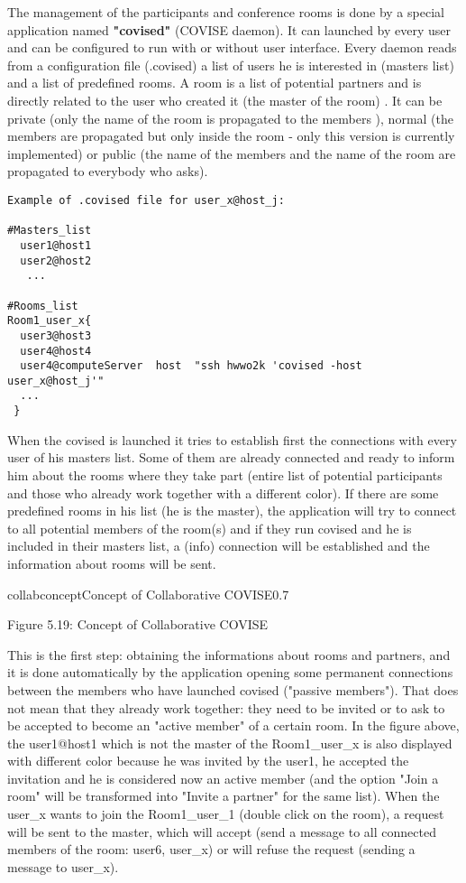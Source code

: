 The management of the participants and conference rooms is done by a special 
application named {\bf "covised"} (COVISE daemon). It can launched by every user and can be 
configured to run with or without user interface. Every daemon reads from a 
configuration file (.covised) a list of users he is interested in (masters list) and 
a list of predefined rooms. A room is a list of potential partners and is directly 
related to the user who created it (the master of the room) . It can be 
private (only the name of the room is propagated to the members ), normal 
(the members are propagated but only inside the room - only this version is currently
implemented) or public (the name of the members and the name of the room are propagated to everybody who asks).

\begin{verbatim}
Example of .covised file for user_x@host_j:

#Masters_list  
  user1@host1
  user2@host2
   ...

#Rooms_list
Room1_user_x{
  user3@host3
  user4@host4
  user4@computeServer  host  "ssh hwwo2k 'covised -host user_x@host_j'" 
  ...
 }
\end{verbatim}
 
When the covised is launched it tries to establish first the connections with every 
user of his masters list. Some of them are already connected and ready to inform him 
about the rooms where they take part (entire list of potential participants and 
those who already work together with a different color). If there are some predefined 
rooms in his list (he is the master), the application will try to connect to all 
potential members of the room(s) and if they run covised and he is included in their 
masters list, a (info) connection will be established and the information about rooms 
will be sent. 

\begin{covimg}{collab}{concept}{Concept of Collaborative COVISE}{0.7}\end{covimg}
\begin{htmlonly}
Figure 5.19: Concept of Collaborative COVISE
\vspace{0.5cm}
\end{htmlonly}


This is the first step: obtaining the informations about rooms and partners, and it 
is done automatically by the application opening some permanent connections between 
the members who have launched covised ("passive members"). That does not mean that they 
already work together: they need to be invited or to ask to be accepted to become 
an "active member" of a certain room. In the figure above, the user1@host1 which 
is not the master of the Room1\_user\_x is also displayed with different color because 
he was invited  by the user1, he accepted the invitation and he is considered now 
an active member (and the option "Join a room" will be transformed 
into "Invite a partner" for the same list). When the user\_x wants to join the 
Room1\_user\_1 (double click on the room), a request will be sent to the master, which 
will accept (send a message to all connected members of the room:  user6, user\_x) 
or will refuse the request (sending a message to user\_x). 

